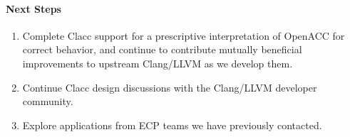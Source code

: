 \paragraph{Next Steps}

\begin{enumerate}

\item Complete Clacc support for a prescriptive interpretation of OpenACC
for correct behavior, and continue to contribute mutually beneficial
improvements to upstream Clang/LLVM as we develop them.

\item Continue Clacc design discussions with the Clang/LLVM developer
community.

\item Explore applications from ECP teams we have previously contacted.
	
\end{enumerate}
